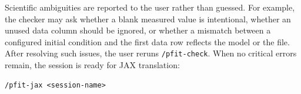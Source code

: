 Scientific ambiguities are reported to the user rather than guessed. For
example, the checker may ask whether a blank measured value is intentional,
whether an unused data column should be ignored, or whether a mismatch between a
configured initial condition and the first data row reflects the model or the
file. After resolving such issues, the user reruns \texttt{/pfit-check}. When no
critical errors remain, the session is ready for JAX translation:

\begin{verbatim}
/pfit-jax <session-name>
\end{verbatim}

